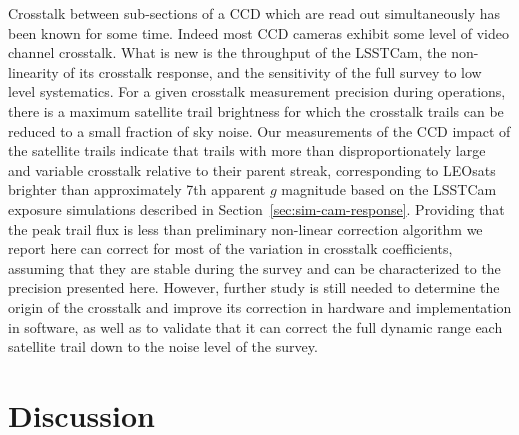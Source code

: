 \documentclass[twocolumn,trackchanges]{aastex63}
\begin{document}
Crosstalk between sub-sections of a CCD which are read out simultaneously has been known for some time.  Indeed most CCD cameras exhibit some level of video channel crosstalk. What is new is the throughput of the LSSTCam, the non-linearity of its crosstalk response, and the sensitivity of the full survey to low level systematics. For a given crosstalk measurement precision during operations, there is a maximum satellite trail brightness for which the crosstalk trails can be reduced to a small fraction of sky noise. Our measurements of the CCD impact of the satellite trails indicate that trails with more than  disproportionately large and variable crosstalk relative to their parent streak, corresponding to LEOsats brighter than approximately 7th apparent $g$ magnitude based on the LSSTCam exposure simulations described in Section~\ref{sec:sim-cam-response}. 
Providing that the peak trail flux is less than  preliminary non-linear correction algorithm we report here can correct for most of the variation in crosstalk coefficients, assuming that they are stable during the survey and can be characterized to the precision presented here. However, further study is still needed to determine the origin of the crosstalk and improve its correction in hardware and implementation in software, as well as to validate that it can correct the full dynamic range each satellite trail down to  the noise level of the survey.



\section{Discussion}
\label{sec:discuss}
\end{document}
